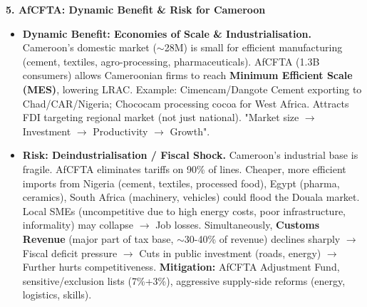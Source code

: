 \documentclass[11pt]{article}
\begin{document}
\begin{exoresolu}
\textbf{5. AfCFTA: Dynamic Benefit \& Risk for Cameroon}
\begin{itemize}
    \item \textbf{Dynamic Benefit: Economies of Scale \& Industrialisation.}
    Cameroon's domestic market ($\sim$28M) is small for efficient manufacturing (cement, textiles, agro-processing, pharmaceuticals). AfCFTA (1.3B consumers) allows Cameroonian firms to reach \textbf{Minimum Efficient Scale (MES)}, lowering LRAC. Example: Cimencam/Dangote Cement exporting to Chad/CAR/Nigeria; Chococam processing cocoa for West Africa. Attracts FDI targeting regional market (not just national). "Market size $\rightarrow$ Investment $\rightarrow$ Productivity $\rightarrow$ Growth".
    \item \textbf{Risk: Deindustrialisation / Fiscal Shock.}
    Cameroon's industrial base is fragile. AfCFTA eliminates tariffs on 90\% of lines. Cheaper, more efficient imports from Nigeria (cement, textiles, processed food), Egypt (pharma, ceramics), South Africa (machinery, vehicles) could flood the Douala market. Local SMEs (uncompetitive due to high energy costs, poor infrastructure, informality) may collapse $\rightarrow$ Job losses. Simultaneously, \textbf{Customs Revenue} (major part of tax base, $\sim$30-40\% of revenue) declines sharply $\rightarrow$ Fiscal deficit pressure $\rightarrow$ Cuts in public investment (roads, energy) $\rightarrow$ Further hurts competitiveness. \textbf{Mitigation:} AfCFTA Adjustment Fund, sensitive/exclusion lists (7\%+3\%), aggressive supply-side reforms (energy, logistics, skills).
\end{itemize}
\end{exoresolu}
\end{document}
